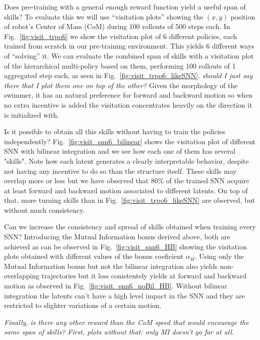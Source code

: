 \documentclass{article} %
\begin{document}
Does pre-training with a general enough reward function yield a useful span of skills? To evaluate this we will use ``visitation plots'' showing the $(x,y)$ position of robot's Center of Mass (CoM) during 100 rollouts of 500 steps each. In Fig.\ \ref{fig:visit_trpo6} we show the visitation plot of 6 different policies, each trained from scratch in our pre-training environment. This yields 6 different ways of ``solving'' it. We can evaluate the combined span of skills with a visitation plot of the hierarchical multi-policy based on them, performing 100 rollouts of 1 aggregated step each, as seen in Fig.\ \ref{fig:visit_trpo6_likeSNN}. \textit{should I just say there that I plot them one on top of the other?} Given the morphology of the swimmer, it has an natural preference for forward and backward motion so when no extra incentive is added the visitation concentrates heavily on the direction it is initialized with.

Is it possible to obtain all this skills without having to train the policies independently? Fig.\ \ref{fig:visit_snn6_bilinear} shows the visitation plot of different SNN with bilinear integration and we see how each one of them has several "skills". Note how each latent generates a clearly interpretable behavior, despite not having any incentive to do so than the structure itself. These skills may overlap more or less but we have observed that 80\% of the trained SNN acquire at least forward and backward motion associated to different latents. On top of that, more turning skills than in Fig.\ \ref{fig:visit_trpo6_likeSNN} are observed, but without much consistency.

Can we increase the consistency and spread of skills obtained when training every SNN? Introducing the Mutual Information bonus derived above, both are achieved as can be observed in Fig.\ \ref{fig:visit_snn6_HB} showing the visitation plots obtained with different values of the bonus coeficient $\alpha_H$. Using only the Mutual Information bonus but not the bilinear integration also yields non-overlapping trajectories but it less conistentely yields at forward and backward motion as observed in Fig.\ \ref{fig:visit_snn6_noBil_HB}. Without bilinear integration the latents can't have a high level impact in the SNN and they are restricted to slighter variations of a certain motion.

\textit{Finally, is there any other reward than the CoM speed that would encourage the same span of skills? First, plots without that: only MI doesn't go far at all.}
\end{document}
